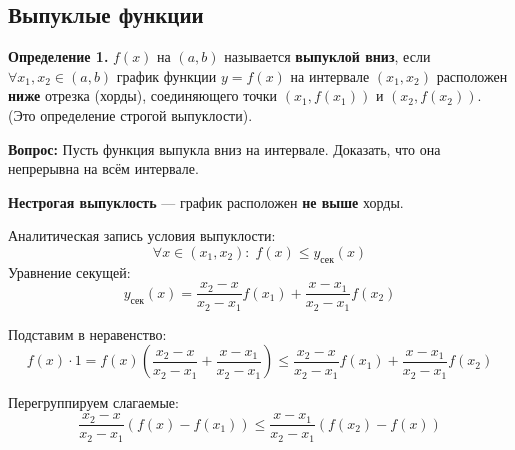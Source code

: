 \documentclass[12pt, a4paper]{article}
\begin{document}
\subsection{Выпуклые функции}
\textbf{Определение 1.} $f(x)$ на $(a, b)$ называется \textbf{выпуклой вниз}, если $\forall x_1, x_2 \in (a, b)$ график функции $y = f(x)$ на интервале $(x_1, x_2)$ расположен \textbf{ниже} отрезка (хорды), соединяющего точки $(x_1, f(x_1))$ и $(x_2, f(x_2))$. (Это определение строгой выпуклости).

\begin{center}
\end{center}

\textbf{Вопрос:} Пусть функция выпукла вниз на интервале. Доказать, что она непрерывна на всём интервале. 

\textbf{Нестрогая выпуклость} — график расположен \textbf{не выше} хорды.

Аналитическая запись условия выпуклости:
\[ \forall x \in (x_1, x_2):\; f(x) \leq y_{\text{сек}}(x) \]
Уравнение секущей:
\[ y_{\text{сек}}(x) = \frac{x_2 - x}{x_2 - x_1}f(x_1) + \frac{x - x_1}{x_2 - x_1}f(x_2) \]

Подставим в неравенство:
\[
f(x) \cdot 1 = f(x) \left( \frac{x_2 - x}{x_2 - x_1} + \frac{x - x_1}{x_2 - x_1} \right) \leq \frac{x_2 - x}{x_2 - x_1} f(x_1) + \frac{x - x_1}{x_2 - x_1} f(x_2)
\]

Перегруппируем слагаемые:
\[
\frac{x_2 - x}{x_2 - x_1} \left( f(x) - f(x_1) \right) \leq \frac{x - x_1}{x_2 - x_1} \left( f(x_2) - f(x) \right)
\]
\end{document}
